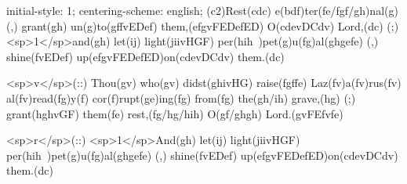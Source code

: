 initial-style: 1;
centering-scheme: english;
(c2)Rest(cdc) e(bdf)ter(fe/fgf/gh)nal(g) (,) grant(gh) un(g)to(gffvEDef) them,(efgvFEDefED) O(cdevDCdv) Lord,(dc) (;) <sp>1</sp>and(gh) let(ij) light(jiivHGF) per(hih~)pet(g)u(fg)al(ghgefe) (,) shine(fvEDef) up(efgvFEDefED)on(cdevDCdv) them.(dc)

<sp>v</sp>(::) Thou(gv) who(gv) didst(ghivHG) raise(fgffe) Laz(fv)a(fv)rus(fv) al(fv)read(fg)y(f) cor(f)rupt(ge)ing(fg) from(fg) the(gh/ih) grave,(hg) (;) grant(hghvGF) them(fe) rest,(fg/hg/hih) O(gf/ghgh) Lord.(gvFEfvfe)

<sp>r</sp>(::) <sp>1</sp>And(gh) let(ij) light(jiivHGF) per(hih~)pet(g)u(fg)al(ghgefe) (,) shine(fvEDef) up(efgvFEDefED)on(cdevDCdv) them.(dc)